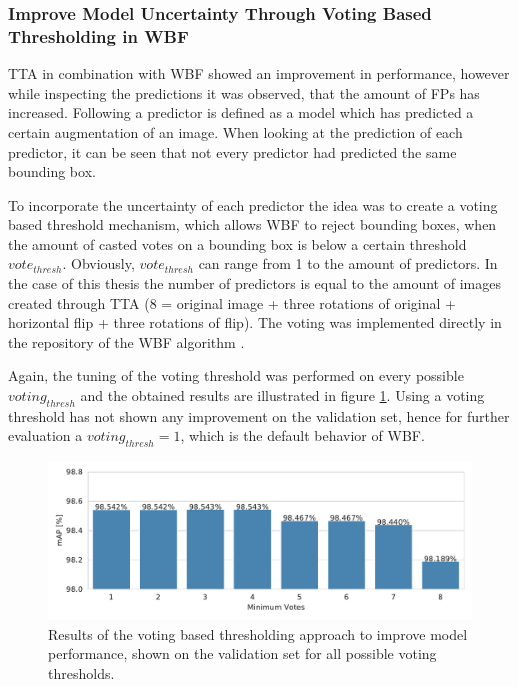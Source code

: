 \subsubsection{Improve Model Uncertainty Through Voting Based Thresholding in \ac{WBF}}

\ac{TTA} in combination with \ac{WBF} showed an improvement in performance, however while inspecting the predictions it was observed, that the amount of \acp{FP} has increased.
Following a predictor is defined as a model which has predicted a certain augmentation of an image.
When looking at the prediction of each predictor, it can be seen that not every predictor had predicted the same bounding box.

To incorporate the uncertainty of each predictor the idea was to create a voting based threshold mechanism, which allows \ac{WBF} to reject bounding boxes, when the amount of casted votes on a bounding box is below a certain threshold $vote_{thresh}$.
Obviously, $vote_{thresh}$ can range from 1 to the amount of predictors.
In the case of this thesis the number of predictors is equal to the amount of images created through \ac{TTA} (8 = original image + three rotations of original + horizontal flip + three rotations of flip).
The voting was implemented directly in the repository of the \ac{WBF} algorithm \cite{weighted_bbox_fusion}.

Again, the tuning of the voting threshold was performed on every possible $voting_{thresh}$ and the obtained results are illustrated in figure \ref{fig:wbf_tta_nms_votes}.
Using a voting threshold has not shown any improvement on the validation set, hence for further evaluation a $voting_{thresh} = 1$, which is the default behavior of \ac{WBF}.

\begin{figure}
\begin{center}
    \includegraphics[width=13cm]{imgs/yolo_wbf_tta_votes.pdf}
    \caption{Results of the voting based thresholding approach to improve model performance, shown on the validation set for all possible voting thresholds.}
    \label{fig:wbf_tta_nms_votes}
\end{center}
\end{figure}

